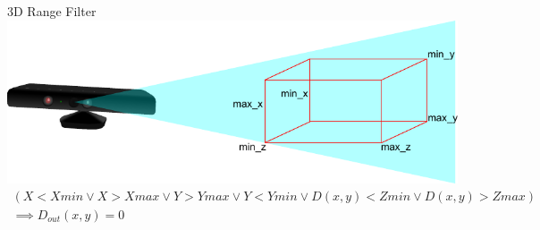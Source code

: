 \documentclass{VLKlauck}
\begin{document}
	\begin{frame}{3D Range Filter}
	 \includegraphics[width=\textwidth]{XYZFilter.pdf}
	 {\tiny
	 \begin{equation}
 	 \begin{split}
 	   	(X < Xmin \vee X > Xmax \vee Y > Ymax \vee Y < Ymin \vee D(x,y) < Zmin \vee D(x,y) > Zmax)\\
 	   	\implies D_{out}(x,y) = 0    	   
 	 \end{split}
 	 \nonumber
	\end{equation}
	} 	 
	\end{frame}
	
	
\end{document}
